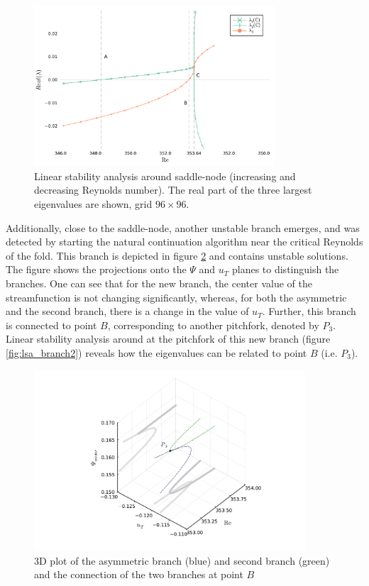 \begin{figure}[h]
  \centering
  \includegraphics[width=0.8\textwidth]{figs/lsa_sn96x96.pdf}
  \caption{Linear stability analysis around saddle-node (increasing and
    decreasing Reynolds number). The real part of the three largest eigenvalues
    are shown, grid $96 \times 96$.} 
  \label{fig:lsa}
\end{figure}

Additionally, close to the saddle-node, another unstable branch emerges, and
was detected by starting the natural continuation algorithm near the critical
Reynolds of the fold. This branch is depicted in figure \ref{fig:branch2} and
contains unstable solutions. The figure shows the projections onto the $\Psi$
and $u_T$ planes to distinguish the branches. One can see that for the new
branch, the center value of the streamfunction is not changing significantly,
whereas, for both the asymmetric and the second branch, there is a change in
the value of $u_T$. Further, this branch is connected to point $B$,
corresponding to another pitchfork, denoted by $P_3$. Linear stability analysis
around at the pitchfork of this new branch (figure \ref{fig:lsa_branch2})
reveals how the eigenvalues can be related to point $B$ (i.e. $P_3$). 

\begin{figure}[h!]
  \centering
  \includegraphics[width=0.9\textwidth]{figs/branch2_64x64.pdf}
  \caption{3D plot of the asymmetric branch (blue) and second branch (green) and the
    connection of the two branches at point $B$}
  \label{fig:branch2}
\end{figure}

